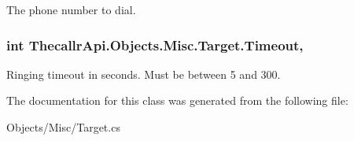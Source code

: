 The phone number to dial. 

\hypertarget{class_thecallr_api_1_1_objects_1_1_misc_1_1_target_a437174a996cedda178c6520adb9bcd70}{
\subsubsection[{Timeout}]{\setlength{\rightskip}{0pt plus 5cm}int Thecallr\+Api.\+Objects.\+Misc.\+Target.\+Timeout\hspace{0.3cm}{\ttfamily [get]}, {\ttfamily [set]}}}\label{class_thecallr_api_1_1_objects_1_1_misc_1_1_target_a437174a996cedda178c6520adb9bcd70}


Ringing timeout in seconds. Must be between 5 and 300. 



The documentation for this class was generated from the following file\+:\begin{DoxyCompactItemize}
\item 
Objects/\+Misc/Target.\+cs\end{DoxyCompactItemize}
